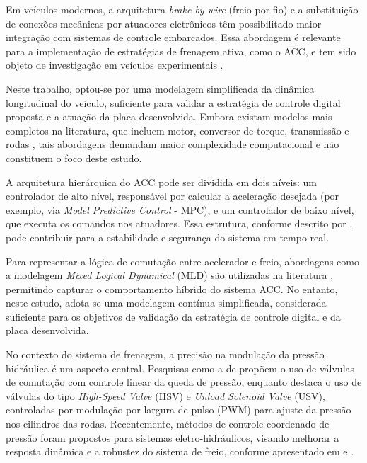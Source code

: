 Em veículos modernos, a arquitetura \textit{brake-by-wire} (freio por fio) e a substituição de conexões mecânicas por atuadores eletrônicos têm possibilitado maior integração com sistemas de controle embarcados. Essa abordagem é relevante para a implementação de estratégias de frenagem ativa, como o ACC, e tem sido objeto de investigação em veículos experimentais \cite{Pananurak2009}.

Neste trabalho, optou-se por uma modelagem simplificada da dinâmica longitudinal do veículo, suficiente para validar a estratégia de controle digital proposta e a atuação da placa desenvolvida. Embora existam modelos mais completos na literatura, que incluem motor, conversor de torque, transmissão e rodas \cite{LuuAndLupu2019}, tais abordagens demandam maior complexidade computacional e não constituem o foco deste estudo.

A arquitetura hierárquica do ACC pode ser dividida em dois níveis: um controlador de alto nível, responsável por calcular a aceleração desejada (por exemplo, via \textit{Model Predictive Control} - MPC), e um controlador de baixo nível, que executa os comandos nos atuadores. Essa estrutura, conforme descrito por , pode contribuir para a estabilidade e segurança do sistema em tempo real.

Para representar a lógica de comutação entre acelerador e freio, abordagens como a modelagem \textit{Mixed Logical Dynamical} (MLD) são utilizadas na literatura \cite{LihuaLuo2016}, permitindo capturar o comportamento híbrido do sistema ACC. No entanto, neste estudo, adota-se uma modelagem contínua simplificada, considerada suficiente para os objetivos de validação da estratégia de controle digital e da placa desenvolvida.

No contexto do sistema de frenagem, a precisão na modulação da pressão hidráulica é um aspecto central. Pesquisas como a de  propõem o uso de válvulas de comutação com controle linear da queda de pressão, enquanto  destaca o uso de válvulas do tipo \textit{High-Speed Valve} (HSV) e \textit{Unload Solenoid Valve} (USV), controladas por modulação por largura de pulso (PWM) para ajuste da pressão nos cilindros das rodas. Recentemente, métodos de controle coordenado de pressão foram propostos para sistemas eletro-hidráulicos, visando melhorar a resposta dinâmica e a robustez do sistema de freio, conforme apresentado em  e .


